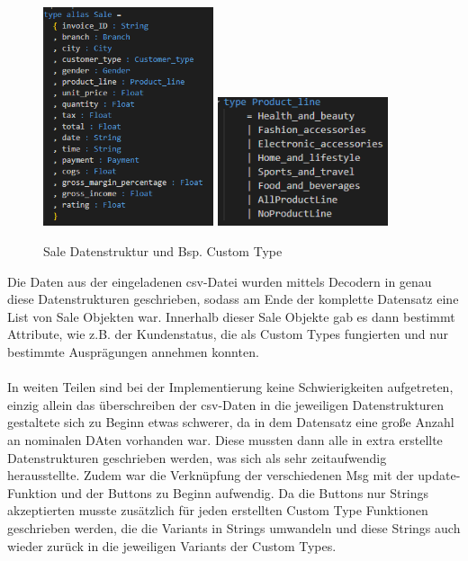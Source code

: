 \documentclass[usegeometry=true]{scrartcl}
\begin{document}
\begin{figure} [H]
	\begin{center}
		\includegraphics[width=5cm]{IMG/SaleDatenstruktur}
		\includegraphics[width=5cm]{IMG/ProductLine}
		\caption{Sale Datenstruktur und Bsp. Custom Type}
		\label{fig:Sale}
	\end{center}
\end{figure}

\noindent Die Daten aus der eingeladenen csv-Datei wurden mittels Decodern in genau diese Datenstrukturen geschrieben, sodass am Ende der komplette Datensatz eine List von Sale
Objekten war. Innerhalb dieser Sale Objekte gab es dann bestimmt Attribute, wie z.B. der Kundenstatus, die als Custom Types fungierten und nur bestimmte Ausprägungen annehmen
konnten.\\ \\
\noindent In weiten Teilen sind bei der Implementierung keine Schwierigkeiten aufgetreten, einzig allein das überschreiben der csv-Daten in die jeweiligen Datenstrukturen
gestaltete sich zu Beginn etwas schwerer, da in dem Datensatz eine große Anzahl an nominalen DAten vorhanden war. Diese mussten dann alle in extra erstellte Datenstrukturen
geschrieben werden, was sich als sehr zeitaufwendig herausstellte. Zudem war die Verknüpfung der verschiedenen Msg mit der update-Funktion und der Buttons zu Beginn aufwendig.
Da die Buttons nur Strings akzeptierten musste zusätzlich für jeden erstellten Custom Type Funktionen geschrieben werden, die die Variants in Strings umwandeln und diese Strings auch
wieder zurück in die jeweiligen Variants der Custom Types.
\end{document}
